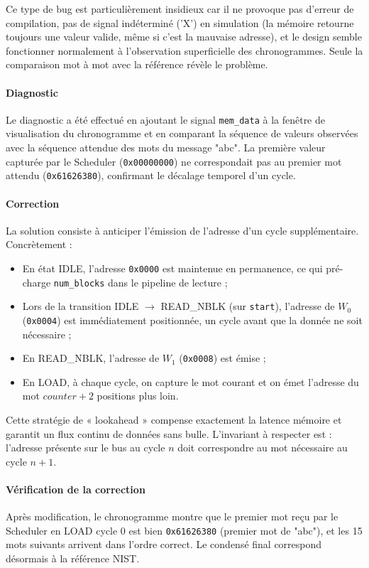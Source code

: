 Ce type de bug est particulièrement insidieux car il ne provoque pas d'erreur de compilation, pas de signal indéterminé ('X') en simulation (la mémoire retourne toujours une valeur valide, même si c'est la mauvaise adresse), et le design semble fonctionner normalement à l'observation superficielle des chronogrammes. Seule la comparaison mot à mot avec la référence révèle le problème.

\paragraph{Diagnostic} Le diagnostic a été effectué en ajoutant le signal \texttt{mem\_data} à la fenêtre de visualisation du chronogramme et en comparant la séquence de valeurs observées avec la séquence attendue des mots du message "abc". La première valeur capturée par le Scheduler (\texttt{0x00000000}) ne correspondait pas au premier mot attendu (\texttt{0x61626380}), confirmant le décalage temporel d'un cycle.

\paragraph{Correction} La solution consiste à anticiper l'émission de l'adresse d'un cycle supplémentaire. Concrètement :

\begin{itemize}
    \item En état IDLE, l'adresse \texttt{0x0000} est maintenue en permanence, ce qui pré-charge \texttt{num\_blocks} dans le pipeline de lecture ;
    \item Lors de la transition IDLE $\rightarrow$ READ\_NBLK (sur \texttt{start}), l'adresse de $W_0$ (\texttt{0x0004}) est immédiatement positionnée, un cycle avant que la donnée ne soit nécessaire ;
    \item En READ\_NBLK, l'adresse de $W_1$ (\texttt{0x0008}) est émise ;
    \item En LOAD, à chaque cycle, on capture le mot courant et on émet l'adresse du mot $counter + 2$ positions plus loin.
\end{itemize}

Cette stratégie de « lookahead » compense exactement la latence mémoire et garantit un flux continu de données sans bulle. L'invariant à respecter est : l'adresse présente sur le bus au cycle $n$ doit correspondre au mot nécessaire au cycle $n+1$.

\paragraph{Vérification de la correction} Après modification, le chronogramme montre que le premier mot reçu par le Scheduler en LOAD cycle 0 est bien \texttt{0x61626380} (premier mot de "abc"), et les 15 mots suivants arrivent dans l'ordre correct. Le condensé final correspond désormais à la référence NIST.

